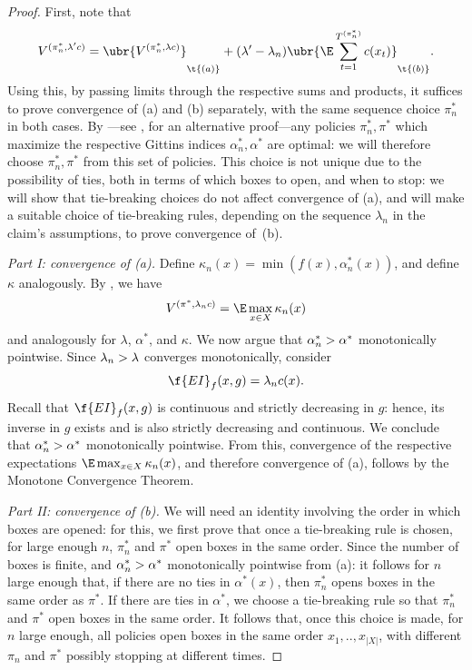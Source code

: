 \documentclass{article}
\begin{document}
\begin{proof}
First, note that 
\[
V^{(\pi_n^*,\lambda'c)} = \ubr{\vphantom{\sum_{t=1}} V^{(\pi_n^*,\lambda c)}}_{\t{(a)}} + (\lambda' - \lambda_n) \ubr{\E \sum_{t=1}^{T^{(\pi_n^*)}} c(x_t)}_{\t{(b)}}
.
\]
Using this, by passing limits through the respective sums and products, it suffices to prove convergence of (a) and (b) separately, with the same sequence choice $\pi^*_n$ in both cases.
By \textcite{weitzman1979optimal}---see \textcite[Theorem 1]{kleinberg2016descending}, for an alternative proof---any policies $\pi_n^*,\pi^*$ which maximize the respective Gittins indices $\alpha^*_n, \alpha^*$ are optimal: we will therefore choose $\pi^*_n,\pi^*$ from this set of policies.
This choice is not unique due to the possibility of ties, both in terms of which boxes to open, and when to stop: we will show that tie-breaking choices do not affect convergence of (a), and will make a suitable choice of tie-breaking rules, depending on the sequence $\lambda_n$ in the claim's assumptions, to prove convergence of~(b).

\emph{Part I: convergence of (a).}
Define $\kappa_n(x) = \min(f(x),\alpha_n^*(x))$, and define $\kappa$ analogously.
By \textcite[Theorem 1]{kleinberg2016descending}, we have
\[
V^{(\pi^*,\lambda_n c)} = \E \max_{x\in X} \kappa_n(x)
\]
and analogously for $\lambda$, $\alpha^*$, and $\kappa$.
We now argue that $\alpha_n^* \-> \alpha^*$ monotonically pointwise. 
Since $\lambda_n\->\lambda$ converges monotonically, consider
\[
\f{EI}_f(x,g) = \lambda_n c(x).
\]
Recall that $\f{EI}_f(x,g)$ is continuous and strictly decreasing in $g$: hence, its inverse in $g$ exists and is also strictly decreasing and continuous.
We conclude that $\alpha^*_n\->\alpha^*$ monotonically pointwise.
From this, convergence of the respective expectations $\E \max_{x\in X} \kappa_n(x)$, and therefore convergence of (a), follows by the Monotone Convergence Theorem.

\emph{Part II: convergence of (b).}
We will need an identity involving the order in which boxes are opened: for this, we first prove that once a tie-breaking rule is chosen, for large enough $n$, $\pi^*_n$ and $\pi^*$ open boxes in the same order.
Since the number of boxes is finite, and $\alpha^*_n \-> \alpha^*$ monotonically pointwise from (a): it follows for $n$ large enough that, if there are no ties in $\alpha^*(x)$, then $\pi^*_n$ opens boxes in the same order as $\pi^*$.
If there are ties in $\alpha^*$, we choose a tie-breaking rule so that $\pi^*_n$ and $\pi^*$ open boxes in the same order.
It follows that, once this choice is made, for $n$ large enough, all policies open boxes in the same order $x_1,..,x_{|X|}$, with different $\pi_n$ and $\pi^*$ possibly stopping at different times.


\end{proof}
\end{document}
